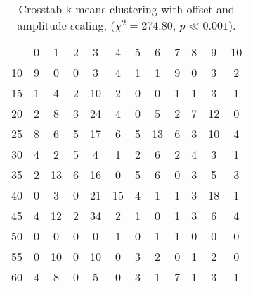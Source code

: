 \begin{table}[]
\centering
\caption{Crosstab k-means clustering with offset and amplitude scaling, ($\chi^2 = 274.80$, $p \ll 0.001$).}
\label{tbl:k-means-offset-amplitude}
\begin{tabular}{cccccccccccc}
	& 0 & 1  & 2 & 3  & 4  & 5 & 6  & 7 & 8 & 9  & 10 \\
	10 & 9 & 0  & 0 & 3  & 4  & 1 & 1  & 9 & 0 & 3  & 2  \\
	15 & 1 & 4  & 2 & 10 & 2  & 0 & 0  & 1 & 1 & 3  & 1  \\
	20 & 2 & 8  & 3 & 24 & 4  & 0 & 5  & 2 & 7 & 12 & 0  \\
	25 & 8 & 6  & 5 & 17 & 6  & 5 & 13 & 6 & 3 & 10 & 4  \\
	30 & 4 & 2  & 5 & 4  & 1  & 2 & 6  & 2 & 4 & 3  & 1  \\
	35 & 2 & 13 & 6 & 16 & 0  & 5 & 6  & 0 & 3 & 5  & 3  \\
	40 & 0 & 3  & 0 & 21 & 15 & 4 & 1  & 1 & 3 & 18 & 1  \\
	45 & 4 & 12 & 2 & 34 & 2  & 1 & 0  & 1 & 3 & 6  & 4  \\
	50 & 0 & 0  & 0 & 0  & 1  & 0 & 1  & 1 & 0 & 0  & 0  \\
	55 & 0 & 10 & 0 & 10 & 0  & 3 & 2  & 0 & 1 & 2  & 0  \\
	60 & 4 & 8  & 0 & 5  & 0  & 3 & 1  & 7 & 1 & 3  & 1 
\end{tabular}
\end{table}